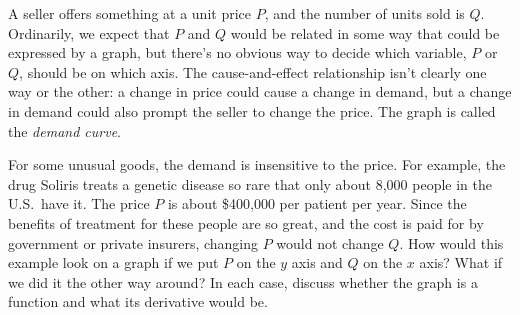 A seller offers something at a unit price $P$, and the number of units
sold is $Q$. Ordinarily, we expect that $P$ and $Q$ would be related in some
way that could be expressed by a graph, but there's no obvious way to decide
which variable, $P$ or $Q$, should be on which axis. The cause-and-effect relationship
isn't clearly one way or the other: a change in price could cause a change in demand,
but a change in demand could also prompt the seller to change the price. 
The graph is called the \emph{demand curve}.

For some
unusual goods, the demand is insensitive to the price. For example, the drug
Soliris treats a genetic disease so rare that only about 8,000 people in the U.S.~have it.
The price $P$ is about \$400,000 per patient per year. Since the benefits
of treatment for these people are so great, and the cost is paid for by government
or private insurers, changing $P$ would not change $Q$. How would this example look
on a graph if we put $P$ on the $y$ axis and $Q$ on the $x$ axis? What if we did
it the other way around? In each case, discuss whether the graph is a function and
what its derivative would be.
